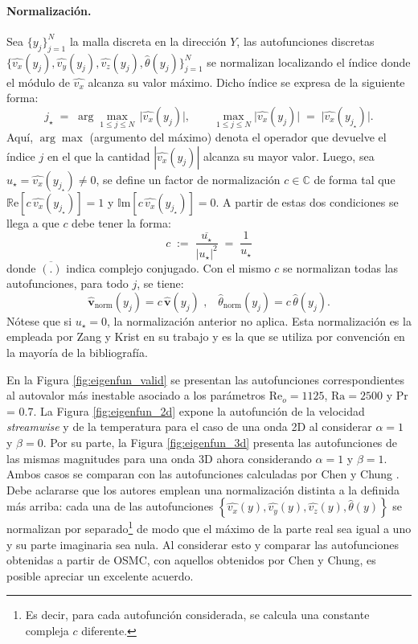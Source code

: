 \paragraph{Normalización.}
Sea $\{y_j\}_{j=1}^{N}$ la malla discreta en la dirección $Y$, las autofunciones \linebreak discretas $\{\widehat{v_x}(y_j),\widehat{v_y}(y_j),\widehat{v_z}(y_j),\widehat{\theta}(y_j)\}_{j=1}^{N}$ se normalizan localizando el índice donde el módulo de $\widehat{v_x}$ alcanza su valor máximo. Dicho índice se expresa de la siguiente forma:
$$
j_\star \;=\; \arg\max_{1\le j\le N}\,\big|\widehat{v_x}(y_j)\big|, 
\qquad 
\max_{1\le j\le N}\big|\widehat{v_x}(y_j)\big| \;=\; \big|\widehat{v_x}(y_{j_\star})\big|.
$$
Aquí, $\arg\max$ (argumento del máximo) denota el operador que devuelve el índice $j$ en el que la cantidad $|\widehat{v_x}(y_j)|$ alcanza su mayor valor. Luego, sea $u_\star=\widehat{v_x}(y_{j_\star})\neq 0$, se define un factor de normalización $c \in \mathbb{C}$ de forma tal que $\mathbb{R}\text{e}[c \, \widehat{v_x}(y_{j_\star})]=1$ y $\mathbb{I}\text{m}[c \, \widehat{v_x}(y_{j_\star})]=0$. A partir de estas dos condiciones se llega a que $c$ debe tener la forma:
$$
c \;:=\; \frac{\overline{u_\star}}{|u_\star|^2} \;=\; \frac{1}{u_\star}
$$
donde $\overline{(\text{.})}$ indica complejo conjugado. Con el mismo $c$ se normalizan todas las autofunciones, para todo $j$, se tiene:
$$
\boldsymbol{\widehat{v}}_{\mathrm{norm}}(y_j)=c\,\boldsymbol{\widehat{v}}(y_j) \text{ ,} \quad
\widehat{\theta}_{\mathrm{norm}}(y_j)=c\,\widehat{\theta}(y_j).
$$
Nótese que si $u_\star=0$, la normalización anterior no aplica. Esta normalización es la empleada por Zang y Krist en su trabajo \cite{zang1989numerical} y es la que se utiliza por convención en la mayoría de la bibliografía.


En la Figura \ref{fig:eigenfun_valid} se presentan las autofunciones correspondientes al autovalor más inestable asociado a los parámetros $\text{Re}_o=1125$, $\text{Ra}=2500$ y Pr = 0.7. La Figura \ref{fig:eigenfun_2d} expone la autofunción de la velocidad \textit{streamwise} y de la temperatura para el caso de una onda 2D al considerar $\alpha=1$ y $\beta=0$. Por su parte, la Figura \ref{fig:eigenfun_3d} presenta las autofunciones de las mismas magnitudes para una onda 3D ahora considerando $\alpha=1$ y $\beta=1$. Ambos casos se comparan con las autofunciones calculadas por Chen y Chung \cite{chen2003direct}. Debe aclararse que los autores emplean una normalización distinta a la definida más arriba: cada una de las autofunciones $\left\lbrace \widehat{v_x}(y), \widehat{v_y}(y), \widehat{v_z}(y), \widehat{\theta}(y) \right\rbrace$ se normalizan por separado\footnote{Es decir, para cada autofunción considerada, se calcula una constante compleja $c$ diferente.} de modo que el máximo de la parte real sea igual a uno y su parte imaginaria sea nula. Al considerar esto y comparar las autofunciones obtenidas a partir de OSMC, con aquellos obtenidos por Chen y Chung, es posible apreciar un excelente acuerdo.

